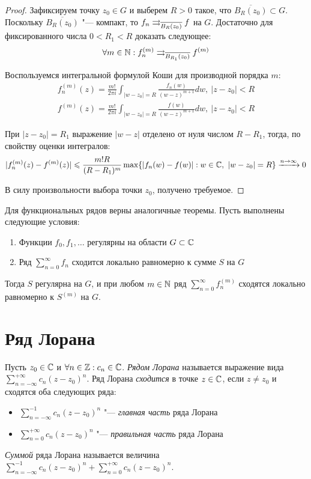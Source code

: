 \begin{proof}
	Зафиксируем точку $z_0 \in G$ и выберем $R > 0$ такое, что $\overline{B_R(z_0)} \subset G$. Поскольку $\overline{B_R(z_0)}$ "--- компакт, то $f_n \rightrightarrows_{\overline{B_R(z_0)}} f$ на $G$. Достаточно для фиксированного числа $0 < R_1 < R$ доказать следующее:
	\[\forall m \in \mathbb{N}: f_n^{(m)} \rightrightarrows_{\overline{B_{R_1}(z_0)}} f^{(m)}\]
	
	Воспользуемся интегральной формулой Коши для производной порядка $m$:
	\begin{gather*}
		f_n^{(m)}(z) = \frac{m!}{2\pi i}\int_{|w - z_0| = R}\frac{f_n(w)}{(w - z)^{m+1}}dw,~|z - z_0| < R\\
		f^{(m)}(z) = \frac{m!}{2\pi i}\int_{|w - z_0| = R}\frac{f(w)}{(w - z)^{m+1}}dw,~|z - z_0| < R
	\end{gather*}
	
	При $|z - z_0| = R_1$ выражение $|w - z|$ отделено от нуля числом $R - R_1$, тогда, по свойству оценки интегралов:
	\[|f_n^{(m)}(z) - f^{(m)}(z)| \leqslant \frac{m!R}{(R - R_1)^m}\max\{|f_n(w) - f(w)| : w \in \mathbb{C},~|w - z_0| = R\} \xrightarrow{n \to \infty} 0\]
	
	В силу произвольности выбора точки $z_0$, получено требуемое.
\end{proof}

\begin{note}
	Для функциональных рядов верны аналогичные теоремы. Пусть выполнены следующие условия:
	\begin{enumerate}
		\item Функции $f_0, f_1, \dotsc$ регулярны на области $G \subset \mathbb{C}$
		\item Ряд $\sum_{n=0}^\infty f_n$ сходится локально равномерно к сумме $S$ на $G$
	\end{enumerate}
	
	Тогда $S$ регулярна на $G$, и при любом $m \in \mathbb{N}$ ряд $\sum_{n=0}^\infty f_n^{(m)}$ сходятся локально равномерно к $S^{(m)}$ на $G$.
\end{note}

\section{Ряд Лорана}

\begin{definition}
	Пусть $z_0 \in \mathbb{C}$ и $\forall n \in \mathbb{Z}: c_n \in \mathbb{C}$. \textit{Рядом Лорана} называется выражение вида $\sum_{n = -\infty}^{+\infty}c_n(z - z_0)^n$. Ряд Лорана \textit{сходится} в точке $z \in \mathbb{C}$, если $z \ne z_0$ и сходятся оба следующих ряда:
	\begin{itemize}
		\item $\sum_{n = -\infty}^{-1}c_n(z - z_0)^n$ "--- \textit{главная часть} ряда Лорана
		\item $\sum_{n = 0}^{+\infty}c_n(z - z_0)^n$ "--- \textit{правильная часть} ряда Лорана
	\end{itemize}
	
	\textit{Суммой} ряда Лорана называется величина $\sum_{n = -\infty}^{-1}c_n(z - z_0)^n + \sum_{n = 0}^{+\infty}c_n(z - z_0)^n$.
\end{definition}

